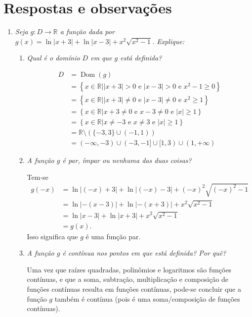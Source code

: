 \documentclass[12pt,a4paper]{article}
\newcommand*\abs[1]{\left|#1\right|}
\begin{document}
\newpage
\restoregeometry
\section*{Respostas e observações}
\begin{enumerate}

\item \textit{ Seja $g: D \to \mathbb{R}$ a função dada por $g(x) = \ln{|x + 3|} + \ln{|x - 3|} + x^2\sqrt{x^2-1}$. Explique:}
\begin{enumerate}
\item \textit{ Qual é o domínio $D$ em que $g$ está definida?}

\begin{align*}
D
& = \operatorname{Dom}(g) \\
& = \left\{ x \in \mathbb{R} | \abs{x + 3} > 0 \text{ e } \abs{x-3} > 0 \text{ e } x^2-1 \geq 0 \right\} \\
& = \left\{ x \in \mathbb{R} | \abs{x + 3} \neq 0 \text{ e } \abs{x-3} \neq 0 \text{ e } x^2 \geq 1 \right\} \\
& = \left\{ x \in \mathbb{R} | x+3 \neq 0 \text{ e } x-3 \neq 0 \text{ e } \abs{x} \geq 1 \right\} \\
& = \left\{ x \in \mathbb{R} | x \neq -3 \text{ e } x\neq 3 \text{ e } \abs{x} \geq 1 \right\} \\
& = \mathbb{R} \setminus \left( \{-3, 3 \} \cup (-1, 1) \right)\\
& = (-\infty, -3) \cup ( -3, -1] \cup [ 1, 3) \cup (1, +\infty)
\end{align*}

\item \textit{ A função $g$ é par, ímpar ou nenhuma das duas coisas?}

Tem-se
\begin{align*}
g(-x)
& = \ln{|(-x) + 3|} + \ln{|(-x) - 3|} + (-x)^2\sqrt{(-x)^2-1} \\
& = \ln{|-(x - 3)|} + \ln{|-(x + 3)|} + x^2\sqrt{x^2-1} \\
& = \ln{|x - 3|} + \ln{|x + 3|} + x^2\sqrt{x^2-1} \\
& = g(x).
\end{align*}
Isso significa que $g$ é uma função par.

\item \textit{ A função $g$ é contínua nos pontos em que está definida? Por quê?}

Uma vez que raízes quadradas, polinômios e logaritmos são funções contínuas, e que a soma, subtração, multiplicação e composição de funções contínuas resulta em funções contínuas, pode-se concluir que a função $g$ também é contínua (pois é uma soma/composição de funções contínuas).


\end{enumerate}
\end{enumerate}
\end{document}
